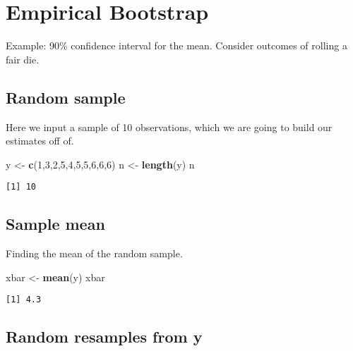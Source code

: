 \documentclass[]{book}
\newenvironment{Shaded}{\begin{snugshade}}{\end{snugshade}}
\newcommand{\KeywordTok}[1]{\textcolor[rgb]{0.13,0.29,0.53}{\textbf{#1}}}
\newcommand{\DecValTok}[1]{\textcolor[rgb]{0.00,0.00,0.81}{#1}}
\newcommand{\StringTok}[1]{\textcolor[rgb]{0.31,0.60,0.02}{#1}}
\newcommand{\NormalTok}[1]{#1}
\theoremstyle{definition}
\theoremstyle{definition}
\theoremstyle{definition}
\theoremstyle{remark}
\begin{document}
\section{Empirical Bootstrap}\label{empirical-bootstrap}

Example: 90\% confidence interval for the mean. Consider outcomes of
rolling a fair die.

\subsection{Random sample}\label{random-sample}

Here we input a sample of 10 observations, which we are going to build
our estimates off of.

\begin{Shaded}
\begin{Highlighting}[]
\NormalTok{y <-}\StringTok{ }\KeywordTok{c}\NormalTok{(}\DecValTok{1}\NormalTok{,}\DecValTok{3}\NormalTok{,}\DecValTok{2}\NormalTok{,}\DecValTok{5}\NormalTok{,}\DecValTok{4}\NormalTok{,}\DecValTok{5}\NormalTok{,}\DecValTok{5}\NormalTok{,}\DecValTok{6}\NormalTok{,}\DecValTok{6}\NormalTok{,}\DecValTok{6}\NormalTok{)}
\NormalTok{n <-}\StringTok{ }\KeywordTok{length}\NormalTok{(y)}
\NormalTok{n}
\end{Highlighting}
\end{Shaded}

\begin{verbatim}
[1] 10
\end{verbatim}

\subsection{Sample mean}\label{sample-mean}

Finding the mean of the random sample.

\begin{Shaded}
\begin{Highlighting}[]
\NormalTok{xbar <-}\StringTok{ }\KeywordTok{mean}\NormalTok{(y)}
\NormalTok{xbar}
\end{Highlighting}
\end{Shaded}

\begin{verbatim}
[1] 4.3
\end{verbatim}

\subsection{Random resamples from y}\label{random-resamples-from-y}
\end{document}
